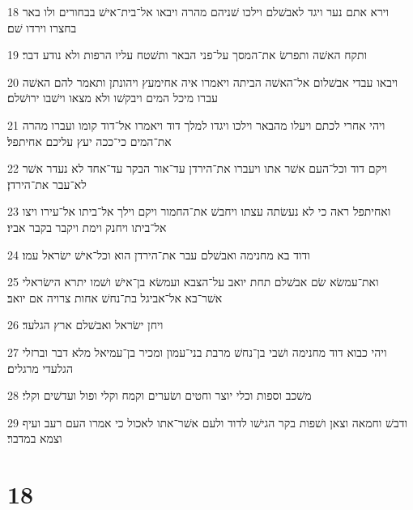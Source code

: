\par 18 וירא אתם נער ויגד לאבשׁלם וילכו שׁניהם מהרה ויבאו אל־בית־אישׁ בבחורים ולו באר בחצרו וירדו שׁם׃
\par 19 ותקח האשׁה ותפרשׂ את־המסך על־פני הבאר ותשׁטח עליו הרפות ולא נודע דבר׃
\par 20 ויבאו עבדי אבשׁלום אל־האשׁה הביתה ויאמרו איה אחימעץ ויהונתן ותאמר להם האשׁה עברו מיכל המים ויבקשׁו ולא מצאו וישׁבו ירושׁלם׃
\par 21 ויהי אחרי לכתם ויעלו מהבאר וילכו ויגדו למלך דוד ויאמרו אל־דוד קומו ועברו מהרה את־המים כי־ככה יעץ עליכם אחיתפל׃
\par 22 ויקם דוד וכל־העם אשׁר אתו ויעברו את־הירדן עד־אור הבקר עד־אחד לא נעדר אשׁר לא־עבר את־הירדן׃
\par 23 ואחיתפל ראה כי לא נעשׂתה עצתו ויחבשׁ את־החמור ויקם וילך אל־ביתו אל־עירו ויצו אל־ביתו ויחנק וימת ויקבר בקבר אביו׃
\par 24 ודוד בא מחנימה ואבשׁלם עבר את־הירדן הוא וכל־אישׁ ישׂראל עמו׃
\par 25 ואת־עמשׂא שׂם אבשׁלם תחת יואב על־הצבא ועמשׂא בן־אישׁ ושׁמו יתרא הישׂראלי אשׁר־בא אל־אביגל בת־נחשׁ אחות צרויה אם יואב׃
\par 26 ויחן ישׂראל ואבשׁלם ארץ הגלעד׃
\par 27 ויהי כבוא דוד מחנימה ושׁבי בן־נחשׁ מרבת בני־עמון ומכיר בן־עמיאל מלא דבר וברזלי הגלעדי מרגלים׃
\par 28 משׁכב וספות וכלי יוצר וחטים ושׂערים וקמח וקלי ופול ועדשׁים וקלי׃
\par 29 ודבשׁ וחמאה וצאן ושׁפות בקר הגישׁו לדוד ולעם אשׁר־אתו לאכול כי אמרו העם רעב ועיף וצמא במדבר׃

\chapter{18}

